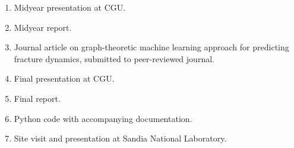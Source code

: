 \begin{enumerate}
\item Midyear presentation at CGU.
\item Midyear report.
\item Journal article on graph-theoretic machine learning approach for predicting fracture dynamics, submitted to peer-reviewed journal.
\item Final presentation at CGU.
\item Final report.
\item Python code with accompanying documentation.
\item Site visit and presentation at Sandia National Laboratory.  

\end{enumerate}
